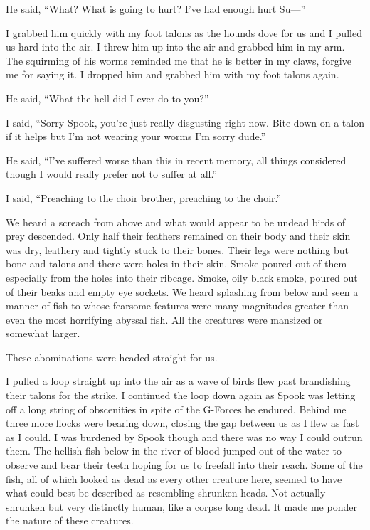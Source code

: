 He said, ``What? What is going to hurt? I've had enough hurt Su---''

I grabbed him quickly with my foot talons as the hounds dove for us and I pulled us hard into the air. I threw him up into the air and grabbed him in my arm. The squirming of his worms reminded me that he is better in my claws, forgive me for saying it. I dropped him and grabbed him with my foot talons again.

He said, ``What the hell did I ever do to you?''

I said, ``Sorry Spook, you're just really disgusting right now. Bite down on a talon if it helps but I'm not wearing your worms I'm sorry dude.''

He said, ``I've suffered worse than this in recent memory, all things considered though I would really prefer not to suffer at all.''

I said, ``Preaching to the choir brother, preaching to the choir.''

\parasep

We heard a screach from above and what would appear to be undead birds of prey descended. Only half their feathers remained on their body and their skin was dry, leathery and tightly stuck to their bones. Their legs were nothing but bone and talons and there were holes in their skin. Smoke poured out of them especially from the holes into their ribcage. Smoke, oily black smoke, poured out of their beaks and empty eye sockets. We heard splashing from below and seen a manner of fish to whose fearsome features were many magnitudes greater than even the most horrifying abyssal fish. All the creatures were mansized or somewhat larger.

These abominations were headed straight for us.

I pulled a loop straight up into the air as a wave of birds flew past brandishing their talons for the strike. I continued the loop down again as Spook was letting off a long string of obscenities in spite of the G-Forces he endured. Behind me three more flocks were bearing down, closing the gap between us as I flew as fast as I could. I was burdened by Spook though and there was no way I could outrun them. The hellish fish below in the river of blood jumped out of the water to observe and bear their teeth hoping for us to freefall into their reach. Some of the fish, all of which looked as dead as every other creature here, seemed to have what could best be described as resembling shrunken heads. Not actually shrunken but very distinctly human, like a corpse long dead. It made me ponder the nature of these creatures.

